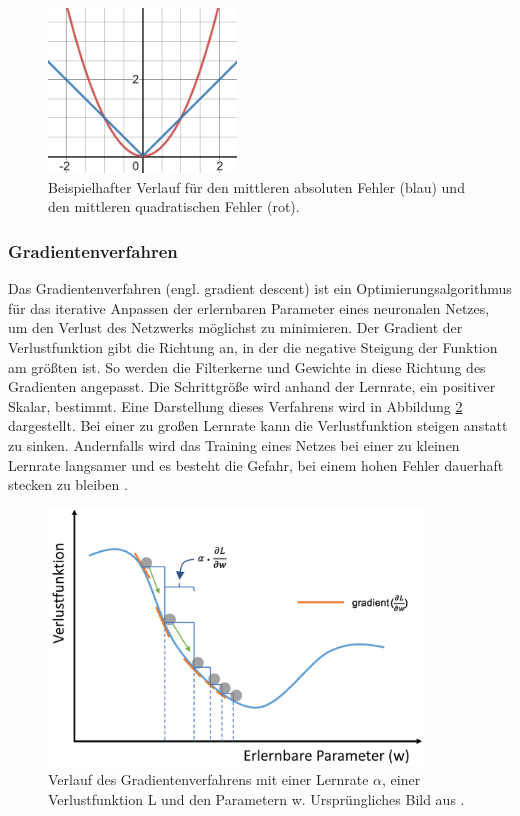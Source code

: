 \begin{figure}[h!]
\centering
\includegraphics[width=5cm]{98_images/mae_mse.png}
\caption{Beispielhafter Verlauf für den mittleren absoluten Fehler (blau) und den mittleren quadratischen Fehler (rot).}
\label{fig:mae-mse}
\end{figure}


\subsubsection{Gradientenverfahren}\label{sec:gradient-descent-sec}
Das Gradientenverfahren (engl. gradient descent) ist ein Optimierungsalgorithmus für das iterative Anpassen der erlernbaren Parameter eines neuronalen Netzes, um den Verlust des Netzwerks möglichst zu minimieren. Der Gradient der Verlustfunktion gibt die Richtung an, in der die negative Steigung der Funktion am größten ist. So werden die Filterkerne und Gewichte in diese Richtung des Gradienten angepasst. Die Schrittgröße wird anhand der Lernrate, ein positiver Skalar, bestimmt. Eine Darstellung dieses Verfahrens wird in Abbildung \ref{fig:grad-descent} dargestellt. Bei einer zu großen Lernrate kann die Verlustfunktion steigen anstatt zu sinken. Andernfalls wird das Training eines Netzes bei einer zu kleinen Lernrate langsamer und es besteht die Gefahr, bei einem hohen Fehler dauerhaft stecken zu bleiben \cite{Goodfellow-et-al-2016}. \cite{cnns-an-overview-and-application-in-radiology}

\begin{figure}[h!]
\centering
\includegraphics[width=10cm]{98_images/gradientenverfahren.png}
\caption{Verlauf des Gradientenverfahrens mit einer Lernrate $\alpha$, einer Verlustfunktion L und den Parametern w. Ursprüngliches Bild aus \cite{cnns-an-overview-and-application-in-radiology}.}
\label{fig:grad-descent}
\end{figure}

